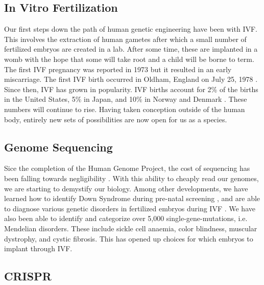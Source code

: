 \subsection{In Vitro Fertilization}

Our first steps down the path of human genetic engineering have been with IVF.
This involves the extraction of human gametes after which a small number of fertilized embryos are created in a lab.
After some time, these are implanted in a womb with the hope that some will take root and a child will be borne to term.
The first IVF pregnancy was reported in 1973 \cite{Kretzer1973} but it resulted in an early miscarriage.
The first IVF birth occurred in Oldham, England on July 25, 1978 \cite{Steptoe1978}.
Since then, IVF has grown in popularity.
IVF births account for 2\% of the births in the United States, 5\% in Japan, and 10\% in Norway and Denmark \cite{Metzl2019}.
These numbers will continue to rise.
Having taken conception outside of the human body, entirely new sets of possibilities are now open for us as a species.

\subsection{Genome Sequencing}

Sice the completion of the Human Genome Project, the cost of sequencing has been falling towards negligibility \cite{Wetterstrand2019}.
With this ability to cheaply read our genomes, we are starting to demystify our biology.
Among other developments, we have learned how to identify Down Syndrome during pre-natal screening \cite{Natoli2012}, and are able to diagnose various genetic disorders in fertilized embryos during IVF \cite{Rycke2017}.
We have also been able to identify and categorize over 5,000 single-gene-mutations, i.e. Mendelian disorders.
These include sickle cell anaemia, color blindness, muscular dystrophy, and cystic fibrosis.
This has opened up choices for which embryos to implant through IVF.

\subsection{CRISPR}


